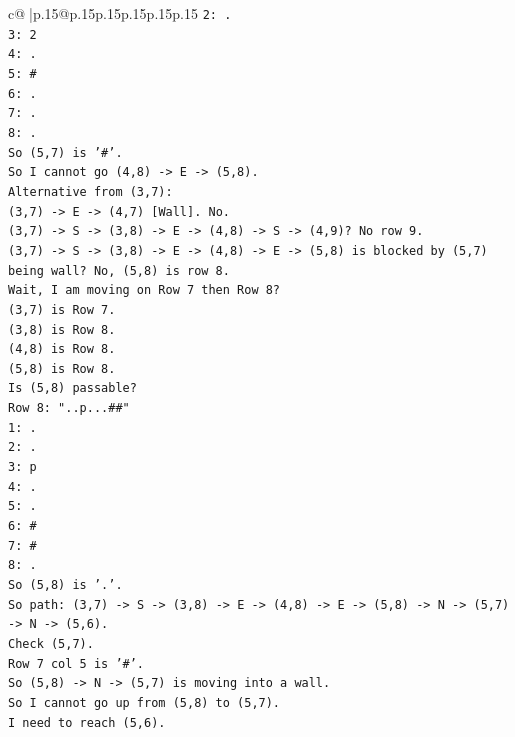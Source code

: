 \documentclass{article}
\begin{document}
{\begin{supertabular}{c@{$\;$}|p{.15\linewidth}@{}p{.15\linewidth}p{.15\linewidth}p{.15\linewidth}p{.15\linewidth}p{.15\linewidth}}
{{{\texttt{2: .} \\
\texttt{3: 2} \\
\texttt{4: .} \\
\texttt{5: \#} \\
\texttt{6: .} \\
\texttt{7: .} \\
\texttt{8: .} \\
\texttt{So (5,7) is '\#'.} \\
\texttt{So I cannot go (4,8) {-}> E {-}> (5,8).} \\
\texttt{Alternative from (3,7):} \\
\texttt{(3,7) {-}> E {-}> (4,7) {[}Wall{]}. No.} \\
\texttt{(3,7) {-}> S {-}> (3,8) {-}> E {-}> (4,8) {-}> S {-}> (4,9)? No row 9.} \\
\texttt{(3,7) {-}> S {-}> (3,8) {-}> E {-}> (4,8) {-}> E {-}> (5,8) is blocked by (5,7) being wall? No, (5,8) is row 8.} \\
\texttt{Wait, I am moving on Row 7 then Row 8?} \\
\texttt{(3,7) is Row 7.} \\
\texttt{(3,8) is Row 8.} \\
\texttt{(4,8) is Row 8.} \\
\texttt{(5,8) is Row 8.} \\
\texttt{Is (5,8) passable?} \\
\texttt{Row 8: "..p...\#\#"} \\
\texttt{1: .} \\
\texttt{2: .} \\
\texttt{3: p} \\
\texttt{4: .} \\
\texttt{5: .} \\
\texttt{6: \#} \\
\texttt{7: \#} \\
\texttt{8: .} \\
\texttt{So (5,8) is '.'.} \\
\texttt{So path: (3,7) {-}> S {-}> (3,8) {-}> E {-}> (4,8) {-}> E {-}> (5,8) {-}> N {-}> (5,7) {-}> N {-}> (5,6).} \\
\texttt{Check (5,7).} \\
\texttt{Row 7 col 5 is '\#'.} \\
\texttt{So (5,8) {-}> N {-}> (5,7) is moving into a wall.} \\
\texttt{So I cannot go up from (5,8) to (5,7).} \\
\texttt{I need to reach (5,6).} \\
}}}
\end{supertabular}}
\end{document}
